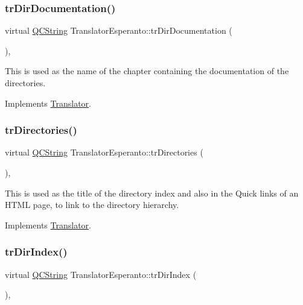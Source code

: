 \subsubsection{\texorpdfstring{trDirDocumentation()}{trDirDocumentation()}}
{\footnotesize\ttfamily virtual \mbox{\hyperlink{class_q_c_string}{Q\+C\+String}} Translator\+Esperanto\+::tr\+Dir\+Documentation (\begin{DoxyParamCaption}{ }\end{DoxyParamCaption})\hspace{0.3cm}{\ttfamily [inline]}, {\ttfamily [virtual]}}

This is used as the name of the chapter containing the documentation of the directories. 

Implements \mbox{\hyperlink{class_translator}{Translator}}.

\mbox{\label{class_translator_esperanto_a9ce964f818ab4851185aada0a0c68301}} 
\subsubsection{\texorpdfstring{trDirectories()}{trDirectories()}}
{\footnotesize\ttfamily virtual \mbox{\hyperlink{class_q_c_string}{Q\+C\+String}} Translator\+Esperanto\+::tr\+Directories (\begin{DoxyParamCaption}{ }\end{DoxyParamCaption})\hspace{0.3cm}{\ttfamily [inline]}, {\ttfamily [virtual]}}

This is used as the title of the directory index and also in the Quick links of an H\+T\+ML page, to link to the directory hierarchy. 

Implements \mbox{\hyperlink{class_translator}{Translator}}.

\mbox{\label{class_translator_esperanto_a0539c4bfc07fc94c412513ce7a7549c2}} 
\subsubsection{\texorpdfstring{trDirIndex()}{trDirIndex()}}
{\footnotesize\ttfamily virtual \mbox{\hyperlink{class_q_c_string}{Q\+C\+String}} Translator\+Esperanto\+::tr\+Dir\+Index (\begin{DoxyParamCaption}{ }\end{DoxyParamCaption})\hspace{0.3cm}{\ttfamily [inline]}, {\ttfamily [virtual]}}

